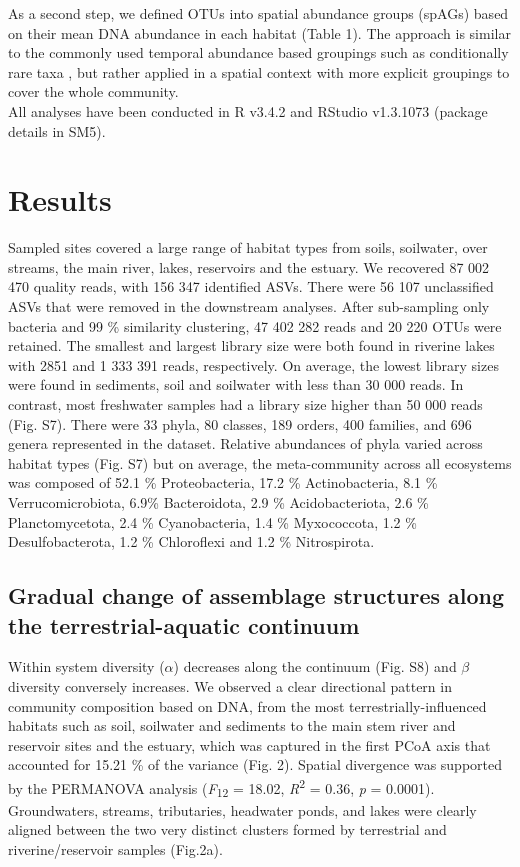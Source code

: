 \documentclass[12pt,a4paper]{article} %
\begin{document}
As a second step, we defined OTUs into spatial abundance groups (spAGs) based on their mean DNA abundance in each habitat (Table 1). The approach is similar to the commonly used temporal abundance based groupings such as conditionally rare taxa \citep{Shade2014}, but rather applied in a spatial context with more explicit groupings to cover the whole community.\\[.3cm]

All analyses have been conducted in R v3.4.2 \citep{RCoreTeam2017} and RStudio v1.3.1073 \citep{RStudioTeam2016} (package details in SM5).

\section*{Results}
Sampled sites covered a large range of habitat types from soils, soilwater, over streams, the main river, lakes, reservoirs and the estuary. We recovered 87 002 470 quality reads, with 156 347 identified ASVs. There were 56 107 unclassified ASVs that were removed in the downstream analyses. After sub-sampling only bacteria and 99 \% similarity clustering, 47 402 282 reads and 20 220 OTUs were retained. The smallest and largest library size were both found in riverine lakes with 2851 and 1 333 391 reads, respectively. On average, the lowest library sizes were found in sediments, soil and soilwater with less than 30 000 reads. In contrast, most freshwater samples had a library size higher than 50 000 reads (Fig. S7). There were 33 phyla, 80 classes,  189 orders, 400 families, and 696 genera represented in the dataset. Relative abundances of phyla varied across habitat types (Fig. S7) but on average, the meta-community across all ecosystems was composed of 52.1 \% Proteobacteria, 17.2 \% Actinobacteria, 8.1 \% Verrucomicrobiota, 6.9\% Bacteroidota, 2.9 \% Acidobacteriota, 2.6 \% Planctomycetota, 2.4 \% Cyanobacteria, 1.4 \% Myxococcota, 1.2 \% Desulfobacterota, 1.2 \% Chloroflexi and 1.2 \% Nitrospirota.

\subsection*{Gradual change of assemblage structures along the terrestrial-aquatic continuum}
Within system diversity ($\alpha$) decreases along the continuum (Fig. S8) and  $\beta$ diversity conversely increases. We observed a clear directional pattern in community composition based on DNA, from the most terrestrially-influenced habitats such as soil, soilwater and sediments to the main stem river and reservoir sites and the estuary, which was captured in the first PCoA axis that accounted for 15.21 \% of the variance (Fig. 2). Spatial divergence was supported by the PERMANOVA analysis (\textit{F}\textsubscript{12} = 18.02, \textit{R}\textsuperscript{2} = 0.36, \textit{p} = 0.0001). Groundwaters, streams, tributaries, headwater ponds, and lakes were clearly aligned between the two very distinct clusters formed by terrestrial and riverine/reservoir samples (Fig.2a).
\end{document}
